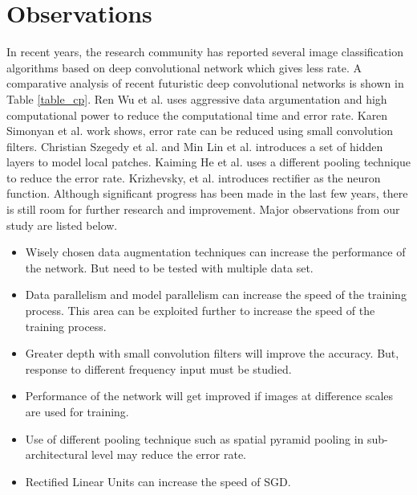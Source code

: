 \documentclass{article}
\begin{document}
 \section {Observations}
In recent years, the research community has reported several image classification algorithms based on deep convolutional network which gives less rate. A comparative analysis of recent futuristic deep convolutional networks is shown in Table \ref{table_cp}.
  Ren Wu et al. \cite{Wu2015} uses aggressive data argumentation and high computational power to reduce the computational time and error rate. Karen Simonyan et al. \cite{Arge2015} work shows, error rate can be reduced using small convolution filters. Christian Szegedy  et al. \cite{Szegedy} and Min Lin et al. \cite{Lin2013} introduces a set of hidden layers to model local patches. Kaiming He et al. \cite{He2014} uses a different pooling technique to reduce the error rate. Krizhevsky, et al. \cite{Krizhevsky2012a}  introduces  rectifier  as the neuron function. Although significant progress has been made in the last few years, there is still room for further research and improvement. Major observations from our study are listed below.
 \begin{itemize}
 \itemsep0em 
 \item  Wisely chosen data  augmentation techniques can increase the performance of the network. But need to be tested with multiple data set.
 \item Data parallelism and model parallelism can increase the speed of the training process. This area can be exploited further to increase the speed of the training process.
 \item Greater depth with small convolution filters will improve the accuracy. But, response to different frequency input must be studied.
 \item Performance of the network will get improved if images at difference scales are used for training.
 \item Use of different pooling technique such as spatial pyramid pooling in sub-architectural level may reduce the error rate. 
 \item Rectified Linear Units can increase the speed of SGD. 
 
 
 \end{itemize}
 
 
\end{document}
